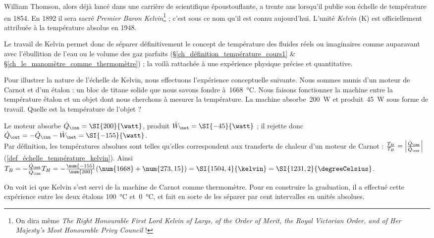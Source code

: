		William Thomson, alors déjà lancé dans une carrière de scientifique époustouflante,  a trente ans lorsqu’il publie son échelle de température en 1854. En 1892 il sera sacré \textit{Premier Baron Kelvin}\footnote{On dira même \textit{The Right Honourable First Lord Kelvin of Largs, of the Order of Merit, the Royal Victorian Order, and of Her Majesty's Most Honourable Privy Council} !} ; c’est sous ce nom qu’il est connu aujourd’hui. L’unité \textit{Kelvin} (\si{\kelvin}) est officiellement attribuée à la température absolue en 1948.
		
		Le travail de Kelvin permet donc de séparer définitivement le concept de température des fluides réels ou imaginaires comme auparavant avec l’ébullition de l’eau ou le volume des gaz parfaits (\S\ref{ch_définition_température_cours1} \& \S\ref{ch_le_manomètre_comme_thermomètre}) ; la voilà rattachée à une expérience physique précise et quantitative.

		\begin{anexample}
			Pour illustrer la nature de l’échelle de Kelvin, nous effectuons l’expérience conceptuelle suivante. Nous sommes munis d’un moteur de Carnot et d’un étalon : un bloc de titane solide que nous savons fondre à~\SI{1668}{\degreeCelsius}. Nous faisons fonctionner la machine entre la température étalon et un objet dont nous cherchons à mesurer la température. La machine absorbe~\SI{200}{\watt} et produit~\SI{45}{\watt} sous forme de travail. Quelle est la température de l’objet ?
				\begin{answer}
					Le moteur absorbe $\dot Q_\inn = \SI{200}{\watt}$, produit $\dot W_\net = \SI{-45}{\watt}$ ; il rejette donc $\dot Q_\out = - \dot Q_\inn - \dot W_\net = \SI{-155}{\watt}$. \\
					Par définition, les températures absolues sont telles qu’elles correspondent aux transferts de chaleur d’un moteur de Carnot : $\frac{T_H}{T_B} = \left|\frac{\dot Q_\inn}{\dot Q_\out}\right|$ (\ref{def_échelle_température_kelvin}). Ainsi $T_B = -\frac{\dot Q_\out}{\dot Q_\inn} T_H = -\frac{\num{-155}}{\num{200}} (\num{1668} + \num{273,15}) = \SI{1504,4}{\kelvin} = \SI{1231,2}{\degreeCelsius}$.
				\end{answer}
					\begin{remark}On voit ici que Kelvin s’est servi de la machine de Carnot comme thermomètre. Pour en construire la graduation, il a effectué cette expérience entre les deux étalons \SI{100}{\degreeCelsius} et~\SI{0}{\degreeCelsius}, et fait en sorte de les séparer par cent intervalles en unités absolues.\end{remark}
		\end{anexample}



